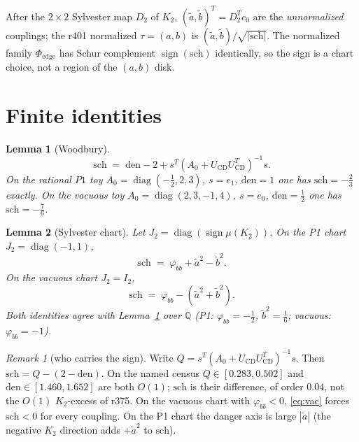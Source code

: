 \documentclass[11pt]{article}
\newtheorem{lemma}{Lemma}
\theoremstyle{remark}
\newtheorem{remark}{Remark}
\newcommand{\sch}{\mathrm{sch}}
\begin{document}
After the $2\times 2$ Sylvester map $D_{2}$ of $K_{2}$,
$(\tilde a,\tilde b)^{T}=D_{2}^{T}c_{0}$ are the
\emph{unnormalized} couplings; the r401 normalized
$\tau=(a,b)$ is $(\tilde a,\tilde b)/\sqrt{|\sch|}$.
The normalized family $\Phi_{\mathrm{edge}}$ has Schur
complement $\operatorname{sign}(\sch)$ identically, so the
sign is a chart choice, not a region of the $(a,b)$ disk.

\section{Finite identities}\label{sec:satz}

\begin{lemma}[Woodbury]\label{lem:wood}
\[
\sch
\;=\;
\mathrm{den}-2+s^{T}(A_{0}+U_{\mathrm{CD}}U_{\mathrm{CD}}^{T})^{-1}s.
\]
On the rational $P1$ toy $A_{0}=\operatorname{diag}(-\tfrac12,2,3)$,
$s=e_{1}$, $\mathrm{den}=1$ one has $\sch=-\tfrac23$ exactly.
On the vacuous toy $A_{0}=\operatorname{diag}(2,3,-1,4)$,
$s=e_{0}$, $\mathrm{den}=\tfrac12$ one has $\sch=-\tfrac76$.
\end{lemma}

\begin{lemma}[Sylvester chart]\label{lem:chart}
Let $J_{2}=\operatorname{diag}(\operatorname{sign}\mu(K_{2}))$.
On the P1 chart $J_{2}=\operatorname{diag}(-1,1)$,
\begin{equation}\label{eq:p1}
\sch
\;=\;
\varphi_{bb}+\tilde a^{2}-\tilde b^{2}.
\end{equation}
On the vacuous chart $J_{2}=I_{2}$,
\begin{equation}\label{eq:vac}
\sch
\;=\;
\varphi_{bb}-(\tilde a^{2}+\tilde b^{2}).
\end{equation}
Both identities agree with Lemma~\ref{lem:wood} over
$\mathbb{Q}$ (P1: $\varphi_{bb}=-\tfrac12$, $\tilde b^{2}=\tfrac16$;
vacuous: $\varphi_{bb}=-1$).
\end{lemma}

\begin{remark}[who carries the sign]\label{rem:split}
Write $Q=s^{T}(A_{0}+U_{\mathrm{CD}}U_{\mathrm{CD}}^{T})^{-1}s$.
Then $\sch=Q-(2-\mathrm{den})$.
On the named census $Q\in[0.283,0.502]$ and
$\mathrm{den}\in[1.460,1.652]$ are both $O(1)$; $\sch$ is
their difference, of order $0.04$, not the $O(1)$ $K_{2}$-excess
of r375.  On the vacuous chart with $\varphi_{bb}<0$,
\eqref{eq:vac} forces $\sch<0$ for every coupling.
On the P1 chart the danger axis is large $|\tilde a|$
(the negative $K_{2}$ direction adds $+\tilde a^{2}$ to $\sch$).
\end{remark}
\end{document}
